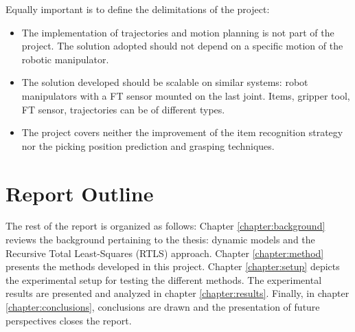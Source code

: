 \documentclass[/home/francois/latex/report/main.tex]{subfiles}
\begin{document}
Equally important is to define the delimitations of the project:

\begin{itemize}
    \item The implementation of trajectories and motion planning is not part of the project. The solution adopted should not depend on a specific motion of the robotic manipulator.
    \item The solution developed should be scalable on similar systems: robot manipulators with a \ac{FT} sensor mounted on the last joint. Items, gripper tool, \ac{FT} sensor, trajectories can be of different types.
    \item The project covers neither the improvement of the item recognition strategy nor the picking position prediction and grasping techniques.
\end{itemize}


\section{Report Outline}

The rest of the report is organized as follows: Chapter \ref{chapter:background} reviews the background pertaining to the thesis: dynamic models and the Recursive Total Least-Squares (RTLS) approach. Chapter \ref{chapter:method} presents the methods developed in this project. Chapter \ref{chapter:setup} depicts the experimental setup for testing the different methods. The experimental results are presented and analyzed in chapter \ref{chapter:results}. Finally, in chapter \ref{chapter:conclusions}, conclusions are drawn and the presentation of future perspectives closes the report.
\end{document}
